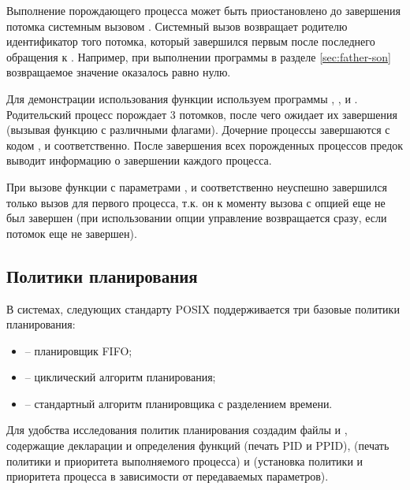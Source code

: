 Выполнение порождающего процесса может быть приостановлено до завершения потомка системным вызовом . Системный вызов  возвращает родителю идентификатор того потомка, который завершился первым после последнего обращения к . Например, при выполнении программы в разделе \ref{sec:father-son} возвращаемое значение оказалось равно нулю. 

Для демонстрации использования функции  используем программы , ,  и . Родительский процесс порождает 3 потомков, после чего ожидает их завершения (вызывая функцию  с различными флагами). Дочерние процессы завершаются с кодом ,  и  соответственно. После завершения всех порожденных процессов предок выводит информацию о завершении каждого процесса.









При вызове функции  с параметрами ,  и  соответственно неуспешно завершился только вызов  для первого процесса, т.к. он к моменту вызова  с опцией  еще не был завершен (при использовании опции  управление возвращается сразу, если потомок еще не завершен).


 
\subsection{Политики планирования}

В системах, следующих стандарту POSIX поддерживается три базовые политики планирования:
\begin{itemize}
	\item {} -- планировщик FIFO;
	\item {} -- циклический алгоритм планирования;
	\item {} -- стандартный алгоритм планировщика с	разделением времени.
\end{itemize}

Для удобства исследования политик планирования создадим файлы  и , содержащие декларации и определения функций  (печать PID и PPID),  (печать политики и приоритета выполняемого процесса) и  (установка политики и приоритета процесса в зависимости от передаваемых параметров).

